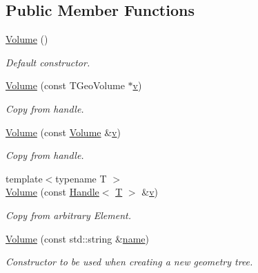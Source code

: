 \subsection*{Public Member Functions}
\begin{DoxyCompactItemize}
\item 
\hyperlink{class_d_d4hep_1_1_geometry_1_1_volume_a5e8cfa8694162b1e3be9401e64667370}{Volume} ()
\begin{DoxyCompactList}\small\item\em Default constructor. \end{DoxyCompactList}\item 
\hyperlink{class_d_d4hep_1_1_geometry_1_1_volume_ac5e2f7fc0aeafa1ca916e01e8a159c29}{Volume} (const T\+Geo\+Volume $\ast$\hyperlink{_multi_view_8cpp_a8320ee13ac034dbf6d624fe8953dd337}{v})
\begin{DoxyCompactList}\small\item\em Copy from handle. \end{DoxyCompactList}\item 
\hyperlink{class_d_d4hep_1_1_geometry_1_1_volume_ac9854eb2a3029d348c04643e44abbea4}{Volume} (const \hyperlink{class_d_d4hep_1_1_geometry_1_1_volume}{Volume} \&\hyperlink{_multi_view_8cpp_a8320ee13ac034dbf6d624fe8953dd337}{v})
\begin{DoxyCompactList}\small\item\em Copy from handle. \end{DoxyCompactList}\item 
{\footnotesize template$<$typename T $>$ }\\\hyperlink{class_d_d4hep_1_1_geometry_1_1_volume_a0deff8e4df9fd73e7fc0083f068a931d}{Volume} (const \hyperlink{class_d_d4hep_1_1_handle}{Handle}$<$ \hyperlink{class_t}{T} $>$ \&\hyperlink{_multi_view_8cpp_a8320ee13ac034dbf6d624fe8953dd337}{v})
\begin{DoxyCompactList}\small\item\em Copy from arbitrary Element. \end{DoxyCompactList}\item 
\hyperlink{class_d_d4hep_1_1_geometry_1_1_volume_a2f7cd845fb0afa8894f7578293c0312e}{Volume} (const std\+::string \&\hyperlink{class_d_d4hep_1_1_handle_a27c7d467a609ab32c133e1f3c7d85ef5}{name})
\begin{DoxyCompactList}\small\item\em Constructor to be used when creating a new geometry tree. \end{DoxyCompactList}\item 

\end{DoxyCompactItemize}
